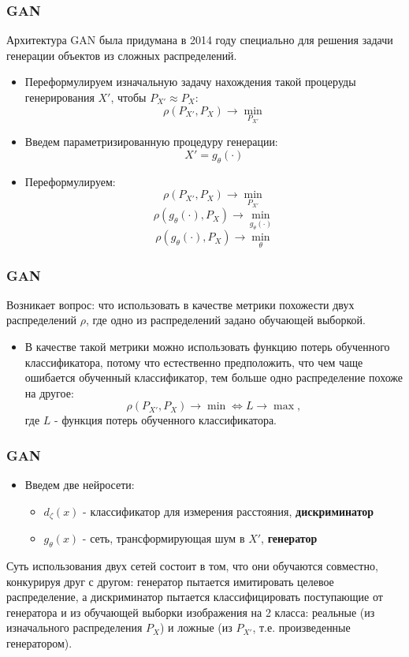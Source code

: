 \documentclass[9pt]{beamer}
\begin{document}
\begin{frame}\frametitle{GAN}
	Архитектура GAN была придумана в 2014 году специально для решения задачи генерации объектов из сложных распределений. \\
	\begin{itemize}
		\item Переформулируем изначальную задачу нахождения такой процеруды генерирования $X'$, чтобы $ P_{X'} \approx P_X$:
		$$ \rho(P_{X'}, P_X) \longrightarrow \underset{P_{X'}}{\min} $$
		\item Введем параметризированную процедуру генерации:
		$$ X' = g_{\theta}(\cdot) $$
		\item Переформулируем:
		$$ \rho(P_{X'}, P_X) \longrightarrow \underset{P_{X'}}{\min} $$
		$$ \rho(g_{\theta}(\cdot), P_X) \longrightarrow \underset{g_{\theta}(\cdot)}{\min} $$
		$$ \rho(g_{\theta}(\cdot), P_X) \longrightarrow \underset{\theta}{\min} $$
	\end{itemize}
	
\end{frame}

\begin{frame}\frametitle{GAN}
	Возникает вопрос: что использовать в качестве метрики похожести двух распределений $\rho$, где одно из распределений задано обучающей выборкой.
	\begin{itemize}
		\item В качестве такой метрики можно использовать функцию потерь обученного классификатора, потому что естественно предположить, что чем чаще ошибается обученный классификатор, тем больше одно распределение похоже на другое:
		$$ \rho(P_{X'}, P_X) \longrightarrow \min \Leftrightarrow L \longrightarrow \max, $$
		где $L$ - функция потерь обученного классификатора.
	\end{itemize}
\end{frame}

\begin{frame}\frametitle{GAN}
	\begin{itemize}
		\item Введем две нейросети:
		\begin{itemize}
			\item $d_{\zeta}(x)$ - классификатор для измерения расстояния, \textbf{дискриминатор}
			\item $g_{\theta}(x)$ - сеть, трансформирующая шум в $X'$, \textbf{генератор}
		\end{itemize}
	\end{itemize}
	Суть использования двух сетей состоит в том, что они обучаются совместно, конкурируя друг с другом: генератор пытается имитировать целевое распределение, а дискриминатор пытается классифицировать поступающие от генератора и из обучающей выборки изображения на 2 класса: реальные (из изначального распределения $P_X$) и ложные (из $P_{X'}$, т.е. произведенные генератором).
\end{frame}
\end{document}
